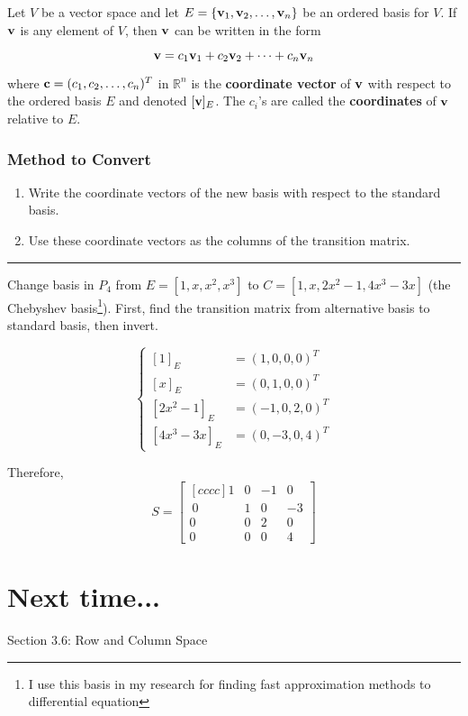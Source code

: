 \begin{tcolorbox}[colback=white!10!,colframe=gray!15!]
	\begin{definition}
		Let $V$ be a vector space and let  $E = \{ {\bf v}_1, {\bf v}_2,  \dots, {\bf v}_n \}$  be an ordered basis for $V$.  If ${\bf v}$ is any element of $V$, then ${\bf v}$ can be written in the form
		
		
		 \[   {\bf v}   =  c_1 {\bf v}_1 + c_2 {\bf v}_2 + \cdots + c_n {\bf v}_n  \]

where ${\bf c} = (c_1, c_2, \dots, c_n)^T$ in $\mathbb{R}^n$ is the \textbf{coordinate vector} of ${\bf v}$ with respect to the ordered basis $E$ and denoted $[{\bf v}]_E$.  The $c_i$'s are called the \textbf{coordinates} of ${\bf v}$ relative to $E$.   


	\end{definition}
	 
\end{tcolorbox}



\subsubsection*{Method to Convert}
\begin{enumerate}
	\item Write the coordinate vectors of the new basis with respect to the standard basis.
	\item Use these coordinate vectors as the columns of the transition matrix. 
\end{enumerate}


  

\rule[0.01in]{\textwidth}{0.0025in}


\begin{example}
	Change basis in $P_4$ from $E=[1, x, x^2, x^3]$ to $C=[1, x, 2x^2 - 1, 4x^3-3x]$ (the Chebyshev basis\footnote{I use this basis in my research for finding fast approximation methods to differential equation}).    First, find the transition matrix from alternative basis to standard basis, then invert.
	
	\[   \begin{cases}
		[1]_E &= (1,0,0,0)^T\\
		[x]_E &= (0,1,0,0)^T\\
		[2x^2 -1]_E &= (-1,0,2,0)^T\\
		[4x^3-3x]_E &=(0,-3,0,4)^T
	\end{cases}  \]
	
	Therefore, 
	\[  S = \begin{bmatrix}[cccc]   1 & 0 & -1 & 0\\\ 0  & 1  & 0 & -3 \\ 0  & 0  & 2 & 0\\ 0 & 0 & 0 & 4 \end{bmatrix}  \]
\end{example}


\section*{Next time...}
Section 3.6: Row and Column Space

